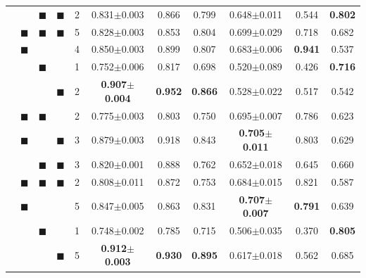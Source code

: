 \documentclass[11pt]{article}
\newcommand{\bs}[0]{$\blacksquare$}
\newcommand{\albert}{\mbox{AlBERTo}}
\newcommand{\ialbert}{\mbox{Incel AlBERTo}}
\begin{document}
\begin{table}[t]
\begin{tabular}{l|c@{\hspace{1mm}}c@{\hspace{1mm}}c@{\hspace{1mm}}|c@{\hspace{1mm}}|ccc|ccc}
        &       &  \bs &  \bs &      2 &      0.831$\pm$0.003 &     0.866 &       0.799 &       0.648$\pm$0.011 &      0.544 &  \bf  0.802 \\ %
        &  \bs  &  \bs &  \bs &      5 &      0.828$\pm$0.003 &     0.853 &       0.804 &       0.699$\pm$0.029 &      0.718 &       0.682 \\ %
        \hline
        \multirow{7}{*}[0pt]{\rotatebox[origin=c]{90}{\begin{minipage}{1.7cm}\albert\end{minipage}}} 
        &  \bs  &      &      &      4 &      0.850$\pm$0.003 &     0.899 &       0.807 &       0.683$\pm$0.006 & \bf  0.941 &       0.537 \\ %
        &       &  \bs &      &      1 &      0.752$\pm$0.006 &     0.817 &       0.698 &       0.520$\pm$0.089 &      0.426 &  \bf  0.716 \\ %
        &       &      &  \bs &      2 & \bf  0.907$\pm$0.004 & \bf 0.952 &  \bf  0.866 &       0.528$\pm$0.022 &      0.517 &       0.542 \\ %
        &  \bs  &  \bs &      &      2 &      0.775$\pm$0.003 &     0.803 &       0.750 &       0.695$\pm$0.007 &      0.786 &       0.623 \\ %
        &  \bs  &      &  \bs &      3 &      0.879$\pm$0.003 &     0.918 &       0.843 &  \bf  0.705$\pm$0.011 &      0.803 &       0.629 \\ %
        &       &  \bs &  \bs &      3 &      0.820$\pm$0.001 &     0.888 &       0.762 &       0.652$\pm$0.018 &      0.645 &       0.660 \\ %
        &  \bs  &  \bs &  \bs &      2 &      0.808$\pm$0.011 &     0.872 &       0.753 &       0.684$\pm$0.015 &      0.821 &       0.587 \\ %
        \hline
        \multirow{7}{*}[0pt]{\rotatebox[origin=c]{90}{\begin{minipage}{2.6cm} \ialbert\end{minipage}}} 
        &  \bs  &      &      &      5 &      0.847$\pm$0.005 &     0.863 &       0.831 &  \bf  0.707$\pm$0.007 & \bf  0.791 &       0.639 \\ %
        &       &  \bs &      &      1 &      0.748$\pm$0.002 &     0.785 &       0.715 &       0.506$\pm$0.035 &      0.370 &  \bf  0.805 \\ %
        &       &      &  \bs &      5 & \bf  0.912$\pm$0.003 & \bf 0.930 &  \bf  0.895 &       0.617$\pm$0.018 &      0.562 &       0.685 \\ %

\end{tabular}
\end{table}
\end{document}
